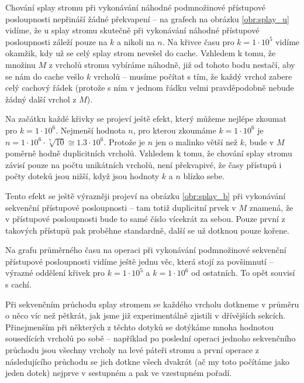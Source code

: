 Chování splay stromu při vykonávání náhodné podmnožinové přístupové
posloupnosti nepřináší žádné překvapení -- na grafech na obrázku \ref{obr:splay_u}
vidíme, že u splay stromu skutečně při vykonávání náhodné přístupové
posloupnosti záleží pouze na $k$ a nikoli na $n$. Na křivce času pro $k =
1\cdot 10^5$ vidíme okamžik, kdy už se celý splay strom nevešel do cache.
Vzhledem k tomu, že množinu $M$ z vrcholů stromu vybíráme náhodně, již od
tohoto bodu nestačí, aby se nám do cache vešlo $k$ vrcholů -- musíme počítat s
tím, že každý vrchol zabere celý cachový řádek (protože s ním v jednom řádku
velmi pravděpodobně nebude žádný další vrchol z $M$).

Na začátku každé křivky se projeví ještě efekt, který můžeme nejlépe zkoumat
pro $k = 1\cdot 10^6$. Nejmenší hodnota $n$, pro kterou zkoumáme $k=1\cdot
10^6$ je $n= 1\cdot 10^6\cdot \sqrt[7]{10} \cong 1.3\cdot10^6$. Protože je $n$
jen o malinko větší než $k$, bude v $M$ poměrně hodně duplicitních vrcholů.
Vzhledem k tomu, že chování splay stromu závisí pouze na počtu unikátních
vrcholů, není překvapivé, že časy přístupů i počty doteků jsou nižší, když jsou hodnoty $k$ a $n$ blízko sebe.

Tento efekt se ještě výrazněji projeví na obrázku \ref{obr:splay_b} při vykonávání sekvenční přístupové posloupnosti -- tam totiž duplicitní prvek v $M$ znamená, že v přístupové posloupnosti bude to samé číslo vícekrát za sebou. Pouze první z takových přístupů pak proběhne standardně, další se už dotknou pouze kořene.

Na grafu průměrného času na operaci při vykonávání podmnožinové sekvenční
přístupové posloupnosti vidíme ještě jednu věc, která stojí za povšimnutí --
výrazné oddělení křivek pro $k=1\cdot 10^5$ a $k=1\cdot 10^6$ od ostatních. To opět souvisí s cachí. 

Při sekvenčním průchodu splay stromem se každého vrcholu dotkneme v průměru o něco víc než pětkrát, jak jsme již experimentálně zjistili v dřívějších sekcích. Přinejmenším při některých z těchto dotyků se dotýkáme mnoha hodnotou sousedících vrcholů po sobě -- například po poslední operaci jednoho sekvenčního průchodu jsou všechny vrcholy na levé páteři stromu a první operace z následujícího průchodu se jich dotkne všech dvakrát (ač my toto počítáme jako jeden dotek) nejprve v sestupném a pak ve vzestupném pořadí. 

